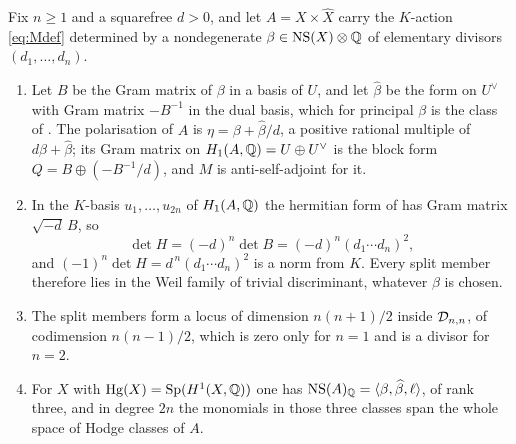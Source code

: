 \begin{proposition}\label{prop:splitgeom}
Fix $n\ge1$ and a squarefree $d>0$, and let $A=X\times\widehat{X}$ carry the
$K$-action \eqref{eq:Mdef} determined by a nondegenerate
$\beta\in\mathrm{NS}(X)\otimes\mathbb{Q}$ of elementary divisors $(d_{1},\dots,d_{n})$.
\begin{enumerate}[label=\textup{(\roman*)},nosep]
\item Let $B$ be the Gram matrix of $\beta$ in a basis of $U$, and let
  $\widehat\beta$ be the form on $U^{\vee}$ with Gram matrix $-B^{-1}$ in the
  dual basis, which for principal $\beta$ is the class of
  . The polarisation of $A$ is
  $\eta=\beta+\widehat{\beta}/d$, a positive rational multiple of
  $d\beta+\widehat\beta$; its Gram matrix on $H_{1}(A,\mathbb{Q})=U\oplus U^{\vee}$
  is the block form $Q=B\oplus(-B^{-1}/d)$, and $M$ is anti-self-adjoint for
  it.
\item In the $K$-basis $u_{1},\dots,u_{2n}$ of $H_{1}(A,\mathbb{Q})$ the hermitian
  form of  has Gram matrix $\sqrt{-d}\,B$, so
  \[
    \det H=(-d)^{n}\det B=(-d)^{n}(d_{1}\cdots d_{n})^{2},
  \]
  and $(-1)^{n}\det H=d^{\,n}(d_{1}\cdots d_{n})^{2}$ is a norm from $K$.
  Every split member therefore lies in the Weil family of trivial
  discriminant, whatever $\beta$ is chosen.
\item The split members form a locus of dimension $n(n+1)/2$ inside
  $\mathcal{D}_{n,n}$, of codimension $n(n-1)/2$, which is zero only for $n=1$ and is
  a divisor for $n=2$.
\item For $X$ with $\operatorname{Hg}(X)=\mathrm{Sp}(H^{1}(X,\mathbb{Q}))$ one has
  $\mathrm{NS}(A)_{\mathbb{Q}}=\langle\beta,\widehat{\beta},\ell\rangle$, of rank three, and
  in degree $2n$ the monomials in those three classes span the whole space of
  Hodge classes of $A$.
\end{enumerate}
\end{proposition}

